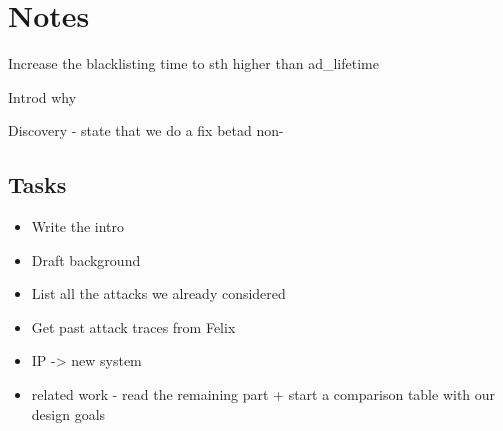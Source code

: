 
\section{Notes}
Increase the blacklisting time to sth higher than ad\_lifetime

Introd why


Discovery - state that we do a fix betad non-



\subsection{Tasks}
\begin{itemize}
    \item Write the intro
    \item Draft background
    \item List all the attacks we already considered
    \item Get past attack traces from Felix
    \item IP -> new system
    \item related work - read the remaining part + start a comparison table with our design goals
\end{itemize}